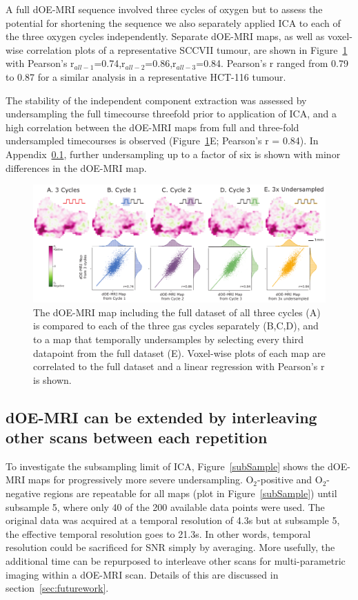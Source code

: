 A full \ac{dOE-MRI} sequence involved three cycles of oxygen but to assess the potential for shortening the sequence we also separately applied \ac{ICA} to each of the three oxygen cycles independently.
Separate \ac{dOE-MRI} maps, as well as voxel-wise correlation plots of a representative SCCVII tumour, are shown in Figure~\ref{fig_repeatability} with Pearson's r$_{all-1}$=0.74,r$_{all-2}$=0.86,r$_{all-3}$=0.84.
Pearson's r ranged from 0.79 to 0.87 for a similar analysis in a representative HCT-116 tumour.

The stability of the independent component extraction was assessed by undersampling the full timecourse threefold prior to application of \ac{ICA}, and a high correlation between the \ac{dOE-MRI} maps from full and three-fold undersampled timecourses is observed (Figure~\ref{fig_repeatability}E; Pearson's r = 0.84). 
In Appendix~\ref{sec:interleave}, further undersampling up to a factor of six is shown with minor differences in the \ac{dOE-MRI} map.

\begin{figure}[htbp]
   \centering
   \includegraphics[width=\textwidth]{oemri_thesis1/oemri_thesis1-images/fig4_repeatability.pdf} %
   \caption{The \ac{dOE-MRI} map including the full dataset of all three cycles (A) is compared to each of the three gas cycles separately (B,C,D), and to a map that temporally undersamples by selecting every third datapoint from the full dataset (E).
Voxel-wise plots of each map are correlated to the full dataset and a linear regression with Pearson's r is shown.
   \label{fig_repeatability}}
\end{figure}

\subsection{dOE-MRI can be extended by interleaving other scans between each repetition}
\label{sec:interleave}
To investigate the subsampling limit of \ac{ICA}, Figure~\ref{subSample} shows the \ac{dOE-MRI} maps for progressively more severe undersampling.
O$_2$-positive and O$_2$-negative regions are repeatable for all maps (plot in Figure~\ref{subSample}) until subsample 5, where only 40 of the 200 available data points were used.
The original data was acquired at a temporal resolution of 4.3s but at subsample 5, the effective temporal resolution goes to 21.3s. 
In other words, temporal resolution could be sacrificed for \ac{SNR} simply by averaging.
More usefully, the additional time can be repurposed to interleave other scans for multi-parametric imaging within a \ac{dOE-MRI} scan.
Details of this are discussed in section~\ref{sec:futurework}. 

